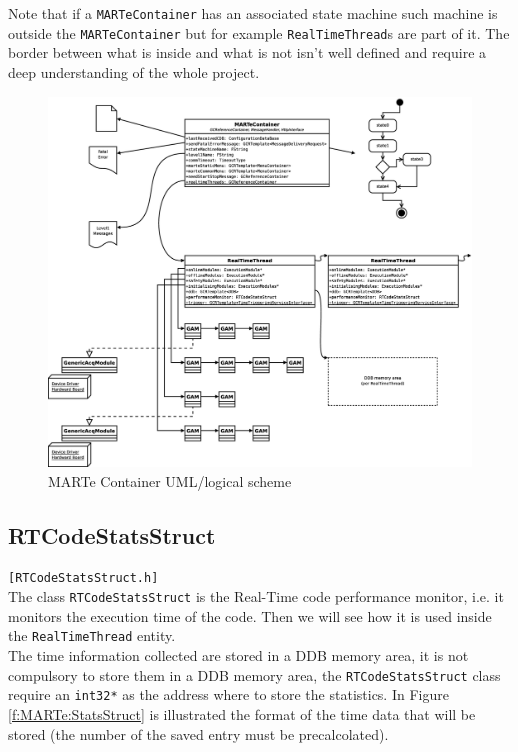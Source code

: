 Note that if a \texttt{MARTeContainer} has an associated state machine such machine is outside the \texttt{MARTeContainer} but for example \texttt{RealTimeThread}s are part of it. The border between what is inside and what is not isn't well defined and require a deep understanding of the whole project. \\

\begin{figure}[h!]
 \begin{center}
  \includegraphics[width=\textwidth]{MARTe/MARTeContainer.eps}
  \caption{MARTe Container UML/logical scheme}
  \label{f:MARTe:MARTeContainer}
 \end{center}
\end{figure}
\clearpage



\subsection{RTCodeStatsStruct}
\texttt{[RTCodeStatsStruct.h]} \\
The class \texttt{RTCodeStatsStruct} is the Real-Time code performance monitor, i.e. it monitors the execution time of the code. Then we will see how it is used inside the \texttt{RealTimeThread} entity. \\


The time information collected are stored in a DDB memory area, it is not compulsory to store them in a DDB memory area, the \texttt{RTCodeStatsStruct} class require an \texttt{int32*} as the address where to store the statistics. In Figure \ref{f:MARTe:StatsStruct} is illustrated the format of the time data that will be stored (the number of the saved entry must be precalcolated).

